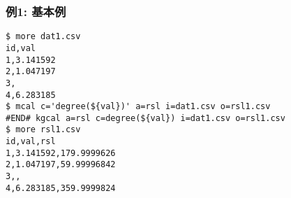\subsubsection*{例1: 基本例}



\begin{Verbatim}[baselinestretch=0.7,frame=single]
$ more dat1.csv
id,val
1,3.141592
2,1.047197
3,
4,6.283185
$ mcal c='degree(${val})' a=rsl i=dat1.csv o=rsl1.csv
#END# kgcal a=rsl c=degree(${val}) i=dat1.csv o=rsl1.csv
$ more rsl1.csv
id,val,rsl
1,3.141592,179.9999626
2,1.047197,59.99996842
3,,
4,6.283185,359.9999824
\end{Verbatim}
